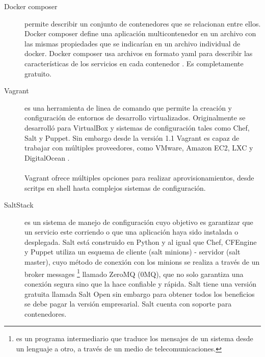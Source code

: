 \begin{description}
\item [Docker composer]
permite describir un conjunto de contenedores que se relacionan entre ellos. Docker composer define una aplicación multicontenedor en un archivo con las mismas propiedades que se indicarían en un archivo individual de docker. Docker composer usa archivos en formato yaml para describir las características de los servicios en cada contenedor \cite{doccom16}. Es completamente gratuito. 

\item [Vagrant]
 es una herramienta de linea de comando que permite la creación y configuración de entornos de desarrollo virtualizados. Originalmente se desarrolló para VirtualBox y sistemas de configuración tales como Chef, Salt y Puppet. Sin embargo desde la versión 1.1 Vagrant es capaz de trabajar con múltiples proveedores, como VMware, Amazon EC2, LXC y DigitalOcean \cite{Vag15}.\\
\\
Vagrant ofrece múltiples opciones para realizar aprovisionamientos, desde scritps en shell hasta complejos sistemas de configuración.

\item [SaltStack]
 es un sistema de manejo de configuración cuyo objetivo es garantizar que un servicio este corriendo o que una aplicación haya sido instalada o desplegada. Salt está construido en Python y al igual que Chef, CFEngine y Puppet utiliza un esquema de cliente (salt minions) - servidor (salt master), cuyo método de conexión con los minions se realiza a través de un broker messages \footnote{es un programa intermediario que traduce los mensajes de un sistema desde un lenguaje a otro, a través de un medio de telecomunicaciones.} llamado ZeroMQ (0MQ), que no solo garantiza una conexión segura sino que la hace confiable y rápida. Salt tiene una versión gratuita llamada Salt Open sin embargo para obtener todos los beneficios se debe pagar la versión empresarial. Salt cuenta con soporte para contenedores. \cite{Salt15}

\end{description}
